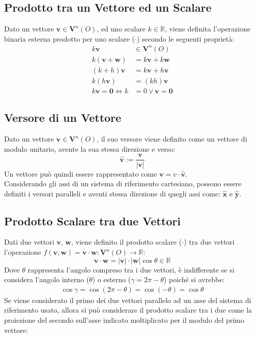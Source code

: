 \documentclass{article}
\newcommand{\vect}[1]{\boldsymbol{\mathbf{#1}}}
\numberwithin{equation}{subsection}
\begin{document}
\subsection{Prodotto tra un Vettore ed un Scalare}
Dato un vettore $\vect{v}\in\vect{V}^{n}{\left(O\right)}$, ed uno scalare $k\in\mathbb{R}$, viene definita l'operazione binaria esterna prodotto per uno scalare ($\cdot$) secondo le seguenti proprietà:
\begin{align*}
    k\vect{v} &\in\vect{V}^{n}{\left(O\right)}\\
    k\left(\vect{v} +\vect{w}\right)&= k\vect{v} + k\vect{w}\\
    \left(k + h\right)\vect{v} &= k\vect{v} + h\vect{v}\\
    k\left(h\vect{v}\right) &= \left(kh\right)\vect{v}\\
    k\vect{v} = \vect{0} \iff k &= 0 \lor \vect{v} = \vect{0}
\end{align*}

\subsection{Versore di un Vettore}

Dato un vettore $\vect{v}\in\vect{V}^{n}{\left(O\right)}$, il suo versore viene definito come un vettore di modulo unitario, avente la sua stessa direzione e verso: 
\begin{equation}
    \hat{\vect{v}} := \frac{\displaystyle\vect{v}}{\displaystyle|\vect{v}|}
\end{equation}
Un vettore può quindi essere rappresentato come $\vect{v} = v\cdot\hat{\vect{v}}$.\\
Considerando gli assi di un sistema di riferimento cartesiano, possono essere definiti i versori paralleli e aventi stessa direzione di quegli assi come: $\hat{\vect{x}}$ e $\hat{\vect{y}}$.

\subsection{Prodotto Scalare tra due Vettori}
Dati due vettori $\vect{v}$, $\vect{w}$, viene definito il prodotto scalare ($\cdot$) tra due vettori l'operazione $f(\vect{v},\vect{w})=\vect{v}\cdot\vect{w}:\vect{V}^{n}(O)\to\mathbb{R}$: 
\begin{equation}
    \vect{v}\cdot\vect{w} =  |\vect{v}|\cdot|\vect{w}| \cos\theta\in \mathbb{R}
\end{equation}
Dove $\theta$ rappresenta l'angolo compreso tra i due vettori, è indifferente se si considera l'angolo interno ($\theta$) o esterno ($\gamma = 2\pi - \theta$) poiché si avrebbe:
\begin{gather*}
    \cos\gamma = \cos(2\pi - \theta) = \cos(-\theta) = \cos\theta
\end{gather*}
Se viene considerato il primo dei due vettori parallelo ad un asse del sistema di riferimento usato, allora si può considerare
il prodotto scalare tra i due come la proiezione del secondo sull'asse indicato moltiplicato per il modulo del primo vettore:
\end{document}
